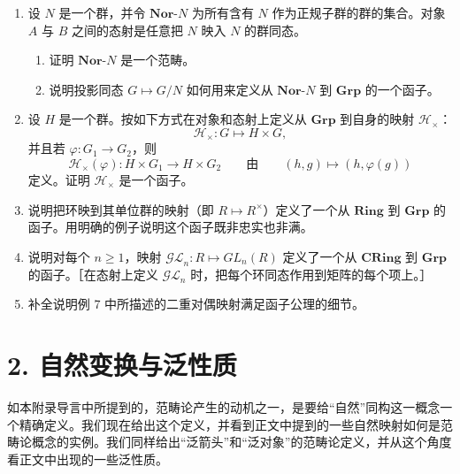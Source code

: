 \begin{enumerate}[label=\arabic*.]
  \item 设 $N$ 是一个群，并令 $\mathbf{Nor}\text{-}N$ 为所有含有 $N$ 作为正规子群的群的集合。对象 $A$ 与 $B$ 之间的态射是任意把 $N$ 映入 $N$ 的群同态。
  \begin{enumerate}[label=(\alph*)]
    \item 证明 $\mathbf{Nor}\text{-}N$ 是一个范畴。
    \item 说明投影同态 $G\mapsto G/N$ 如何用来定义从 $\mathbf{Nor}\text{-}N$ 到 $\mathbf{Grp}$ 的一个函子。
  \end{enumerate}

  \item 设 $H$ 是一个群。按如下方式在对象和态射上定义从 $\mathbf{Grp}$ 到自身的映射 $\mathcal H_{\times}$：
  \[
    \mathcal H_{\times}:G\longmapsto H\times G,
  \]
  并且若 $\varphi:G_1\to G_2$，则
  \[
    \mathcal H_{\times}(\varphi):H\times G_1\longrightarrow H\times G_2
    \qquad\text{由}\qquad
    (h,g)\longmapsto (h,\varphi(g))
  \]
  定义。证明 $\mathcal H_{\times}$ 是一个函子。

  \item 说明把环映到其单位群的映射（即 $R\mapsto R^{\times}$）定义了一个从 $\mathbf{Ring}$ 到 $\mathbf{Grp}$ 的函子。用明确的例子说明这个函子既非忠实也非满。

  \item 说明对每个 $n\geq1$，映射 $\mathcal{GL}_n:R\mapsto GL_n(R)$ 定义了一个从 $\mathbf{CRing}$ 到 $\mathbf{Grp}$ 的函子。［在态射上定义 $\mathcal{GL}_n$ 时，把每个环同态作用到矩阵的每个项上。］

  \item 补全说明例 7 中所描述的二重对偶映射满足函子公理的细节。
\end{enumerate}

\section*{2. 自然变换与泛性质}

如本附录导言中所提到的，范畴论产生的动机之一，是要给“自然”同构这一概念一个精确定义。我们现在给出这个定义，并看到正文中提到的一些自然映射如何是范畴论概念的实例。我们同样给出“泛箭头”和“泛对象”的范畴论定义，并从这个角度看正文中出现的一些泛性质。

